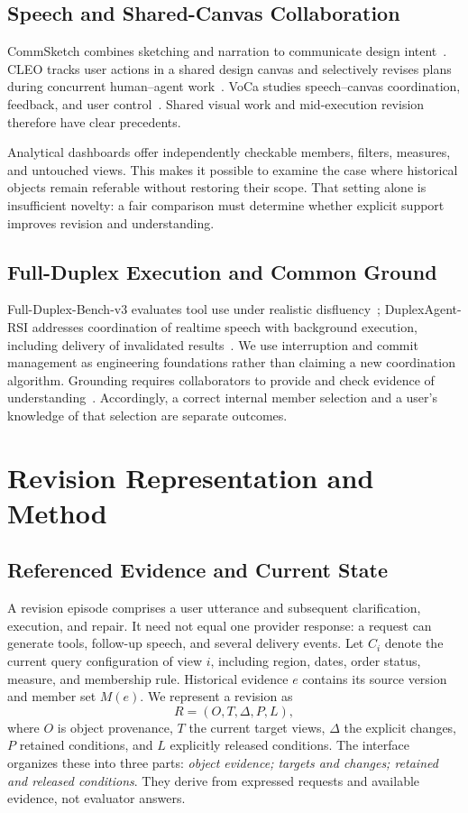 \documentclass[conference,10pt,letterpaper]{IEEEtran}
\begin{document}
\subsection{Speech and Shared-Canvas Collaboration}
CommSketch combines sketching and narration to communicate design intent~\cite{commsketch}. CLEO tracks user actions in a shared design canvas and selectively revises plans during concurrent human--agent work~\cite{cleo}. VoCa studies speech--canvas coordination, feedback, and user control~\cite{voca}. Shared visual work and mid-execution revision therefore have clear precedents.

Analytical dashboards offer independently checkable members, filters, measures, and untouched views. This makes it possible to examine the case where historical objects remain referable without restoring their scope. That setting alone is insufficient novelty: a fair comparison must determine whether explicit support improves revision and understanding.

\subsection{Full-Duplex Execution and Common Ground}
Full-Duplex-Bench-v3 evaluates tool use under realistic disfluency~\cite{fdbv3}; DuplexAgent-RSI addresses coordination of realtime speech with background execution, including delivery of invalidated results~\cite{duplexagent}. We use interruption and commit management as engineering foundations rather than claiming a new coordination algorithm. Grounding requires collaborators to provide and check evidence of understanding~\cite{grounding}. Accordingly, a correct internal member selection and a user's knowledge of that selection are separate outcomes.

\section{Revision Representation and Method}
\subsection{Referenced Evidence and Current State}
A revision episode comprises a user utterance and subsequent clarification, execution, and repair. It need not equal one provider response: a request can generate tools, follow-up speech, and several delivery events. Let $C_i$ denote the current query configuration of view $i$, including region, dates, order status, measure, and membership rule. Historical evidence $e$ contains its source version and member set $M(e)$. We represent a revision as
\begin{equation}
R=(O,T,\Delta,P,L),
\end{equation}
where $O$ is object provenance, $T$ the current target views, $\Delta$ the explicit changes, $P$ retained conditions, and $L$ explicitly released conditions. The interface organizes these into three parts: \emph{object evidence; targets and changes; retained and released conditions}. They derive from expressed requests and available evidence, not evaluator answers.
\end{document}
